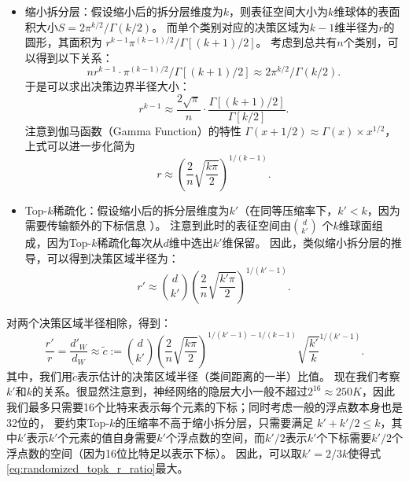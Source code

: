 \begin{itemize}
    \item 
    缩小拆分层：假设缩小后的拆分层维度为$k$，则表征空间大小为$k$维球体的表面积大小$S = 2\pi^{k/2}/\Gamma(k/2)$。
    而单个类别对应的决策区域为$k - 1$维半径为$r$的圆形，其面积为 $r^{k-1}\pi^{(k-1)/2} / \Gamma[(k + 1)/2]$。
    考虑到总共有$n$个类别，可以得到以下关系：
    \begin{equation}
        n r^{k-1} \cdot \pi^{(k-1)/2} / \Gamma[(k + 1)/2] \approx 2\pi^{k/2}/\Gamma(k/2).
    \end{equation}
    于是可以求出决策边界半径大小：
    \begin{equation}
        r^{k-1} \approx \dfrac{2\sqrt\pi}{n} \cdot \dfrac{\Gamma[(k+1)/2]}{\Gamma[k/2]}.
    \end{equation}
    注意到伽马函数（Gamma Function）的特性 $\Gamma(x + 1/2) \approx \Gamma(x)\times x^{1/2}$，上式可以进一步化简为
    \begin{equation}
        r \approx \left(\dfrac{2}{n} \sqrt{\dfrac{k\pi}{2}} \right)^{1/(k-1)}.
    \end{equation}

    \item
    Top-$k$稀疏化：假设缩小后的拆分层维度为$k'$（在同等压缩率下，$k' < k$，因为需要传输额外的下标信息 ）。
    注意到此时的表征空间由${d \choose k'}$ 个$k$维球面组成，因为Top-$k$稀疏化每次从$d$维中选出$k'$维保留。
    因此，类似缩小拆分层的推导，可以得到决策区域半径为：
    \begin{equation}
        r' \approx {d \choose k'} \left(\dfrac{2}{n} \sqrt{\dfrac{k'\pi}{2}} \right)^{1/(k'-1)}.
    \end{equation}
\end{itemize}
%
对两个决策区域半径相除，得到：
\begin{equation}
\label{eq:randomized_topk_r_ratio}
    \dfrac{r'}{r} = \dfrac{d'_W}{d_W} \approx \tilde c := {d \choose k'} \left( \dfrac2n \sqrt{\dfrac{k\pi}{2}} \right)^
    {1/(k'-1) - 1/(k-1)} \sqrt{\dfrac{k'}{k}}^{1/(k' - 1)}.
\end{equation}
%
其中，我们用$\tilde c$表示估计的决策区域半径（类间距离的一半）比值。
%
现在我们考察$k'$和$k$的关系。很显然注意到，神经网络的隐层大小一般不超过$2^{16}\approx 250K$，因此我们最多只需要16个比特来表示每个元素的下标；同时考虑一般的浮点数本身也是32位的，
要约束Top-$k$的压缩率不高于缩小拆分层，只需要满足
$k' +  k'/2 \le k$，其中$k'$表示$k'$个元素的值自身需要$k'$个浮点数的空间，而$k'/2$表示$k'$个下标需要$k'/2$个浮点数的空间（因为16位比特足以表示下标）。
%
因此，可以取$k' = 2/3 k$使得式\eqref{eq:randomized_topk_r_ratio}最大。
%

